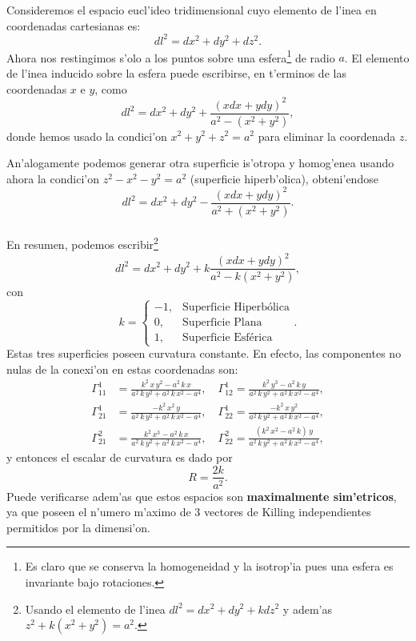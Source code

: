 Consideremos el espacio eucl'ideo tridimensional cuyo elemento de l'inea en coordenadas cartesianas es:
\begin{equation}
dl^{2}= dx^{2} + dy^{2} + dz^{2}.
\end{equation}
Ahora nos restingimos s'olo a los puntos sobre una esfera\footnote{Es claro que se conserva la homogeneidad y la isotrop'ia pues una esfera es invariante bajo rotaciones.} de radio $a$. El elemento de l'inea inducido sobre la esfera puede escribirse, en t'erminos de las coordenadas $x$ e $y$, como
\begin{equation}
dl^{2}= dx^{2} + dy^{2} + \frac{(xdx + ydy)^{2}}{a^2-(x^2 + y^2)},
\end{equation}
donde hemos usado la condici'on $x^2 +y^2 + z^2 =a^2$ para eliminar la coordenada $z$.

An'alogamente podemos generar otra superficie is'otropa y homog'enea usando ahora la condici'on $z^2-x^2-y^2=a^2$ (superficie hiperb'olica), obteni'endose
\begin{equation}
dl^{2}= dx^{2} + dy^{2} - \frac{(xdx + ydy)^{2}}{a^2+(x^2 + y^2)}.
\end{equation}
\\
En resumen, podemos escribir\footnote{Usando el elemento de l'inea $dl^{2}= dx^{2} + dy^{2} + kdz^{2}$ y adem'as $z^2 +k(x^2 + y^2)=a^2$.}
\begin{equation}
dl^{2}= dx^{2} + dy^{2} + k\frac{(xdx + ydy)^{2}}{a^2-k(x^2 + y^2)},\label{60j}
\end{equation}
con
\begin{equation}
k=\left\{\begin{array}{rl}
-1,& \mbox{Superficie Hiperb\'olica}\\ \label{61j}
0,& \mbox{Superficie Plana}\\
1,& \mbox{Superficie Esf\'erica}
\end{array}\right. .
\end{equation}
Estas tres superficies poseen curvatura constante. En efecto, las componentes no nulas de la conexi'on en estas coordenadas son:
\begin{align}
\Gamma^{1}_{11} &= \frac{{k}^{2}\,x\,{y}^{2}-a^{2}\,k\,x}{a^{2}\,k\,{y}^{2}+a^{2}\,k\,{x}^{2}-a^{4}}, \quad
\Gamma^{1}_{12}=\frac{{k}^{2}\,{y}^{3}-a^{2}\,k\,y}{a^{2}\,k\,{y}^{2}+a^{2}\,k\,{x}^{2}-a^{4}}, \\
\Gamma^{1}_{21} &= \frac{-{k}^{2}\,{x}^{2}\,y}{a^{2}\,k\,{y}^{2}+a^{2}\,k\,{x}^{2}-a^{4}},\quad
\Gamma^{1}_{22}=\frac{-{k}^{2}\,x\,{y}^{2}}{a^{2}\,k\,{y}^{2}+a^{2}\,k\,{x}^{2}-a^{4}},\\
\Gamma^{2}_{21} &= \frac{{k}^{2}\,{x}^{3}-a^{2}\,k\,x}{a^{2}\,k\,{y}^{2}+a^{2}\,k\,{x}^{2}-a^{4}}, \quad
\Gamma^{2}_{22}=\frac{\left( {k}^{2}\,{x}^{2}-a^{2}\,k\right) \,y}{a^{2}\,k\,{y}^{2}+a^{2}\,k\,{x}^{2}-a^{4}},
\end{align}
y entonces el escalar de curvatura es dado por
\begin{equation}
R=\frac{2k}{a^2}.
\end{equation}
Puede verificarse adem'as que estos espacios son \textbf{maximalmente sim'etricos}, ya que poseen el n'umero m'aximo de 3 vectores de Killing independientes permitidos por la dimensi'on.

